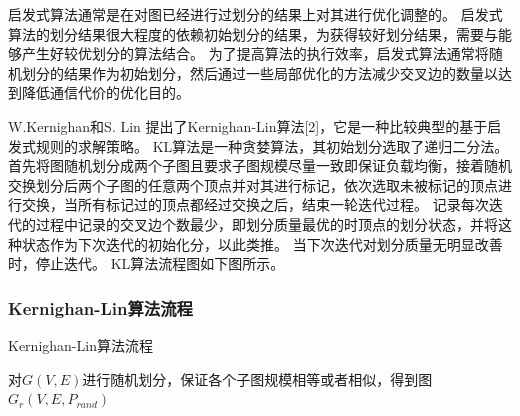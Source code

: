 启发式算法通常是在对图已经进行过划分的结果上对其进行优化调整的。
启发式算法的划分结果很大程度的依赖初始划分的结果，为获得较好划分结果，需要与能够产生好较优划分的算法结合。
为了提高算法的执行效率，启发式算法通常将随机划分的结果作为初始划分，然后通过一些局部优化的方法减少交叉边的数量以达到降低通信代价的优化目的。

W.Kernighan和S. Lin 提出了Kernighan-Lin算法[2]，它是一种比较典型的基于启发式规则的求解策略。
KL算法是一种贪婪算法，其初始划分选取了递归二分法。
首先将图随机划分成两个子图且要求子图规模尽量一致即保证负载均衡，接着随机交换划分后两个子图的任意两个顶点并对其进行标记，依次选取未被标记的顶点进行交换，当所有标记过的顶点都经过交换之后，结束一轮迭代过程。
记录每次迭代的过程中记录的交叉边个数最少，即划分质量最优的时顶点的划分状态，并将这种状态作为下次迭代的初始化分，以此类推。
当下次迭代对划分质量无明显改善时，停止迭代。
KL算法流程图如下图所示。

\subsubsection{Kernighan-Lin算法流程}

\begin{algorithm}[htbp]
\caption{Kernighan-Lin算法流程}
\SetAlgoLined
{}
       
对$G(V,E)$进行随机划分，保证各个子图规模相等或者相似，得到图$G_r(V,E,P_{rand})$

\end{algorithm}


